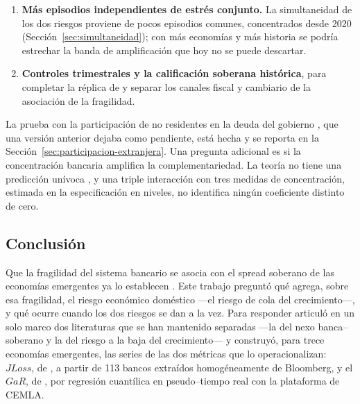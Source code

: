 \begin{enumerate}
\item \textbf{Más episodios independientes de estrés conjunto.} La simultaneidad de los dos riesgos proviene de pocos episodios comunes, concentrados desde 2020 (Sección~\ref{sec:simultaneidad}); con más economías y más historia se podría estrechar la banda de amplificación que hoy no se puede descartar.
\item \textbf{Controles trimestrales y la calificación soberana histórica}, para completar la réplica de \citet{Chari2024b} y separar los canales fiscal y cambiario de la asociación de la fragilidad.
\end{enumerate}

La prueba con la participación de no residentes en la deuda del gobierno \citep{ArslanalpTsuda2014}, que una versión anterior dejaba como pendiente, está hecha y se reporta en la Sección~\ref{sec:participacion-extranjera}. Una pregunta adicional es si la concentración bancaria amplifica la complementariedad. La teoría no tiene una predicción unívoca \citep{MMR2010b,BoydDeNicolo2005}, y una triple interacción con tres medidas de concentración, estimada en la especificación en niveles, no identifica ningún coeficiente distinto de cero.

\subsection{Conclusión}

Que la fragilidad del sistema bancario se asocia con el spread soberano de las economías emergentes ya lo establecen \citet{Chari2024b}. Este trabajo preguntó qué agrega, sobre esa fragilidad, el riesgo económico doméstico ---el riesgo de cola del crecimiento---, y qué ocurre cuando los dos riesgos se dan a la vez. Para responder articuló en un solo marco dos literaturas que se han mantenido separadas ---la del nexo banca--soberano y la del riesgo a la baja del crecimiento--- y construyó, para trece economías emergentes, las series de las dos métricas que lo operacionalizan: $JLoss$, de \citet{Chari2024b}, a partir de 113 bancos extraídos homogéneamente de Bloomberg, y el $GaR$, de \citet{ABG2019b}, por regresión cuantílica en pseudo--tiempo real con la plataforma de CEMLA.


